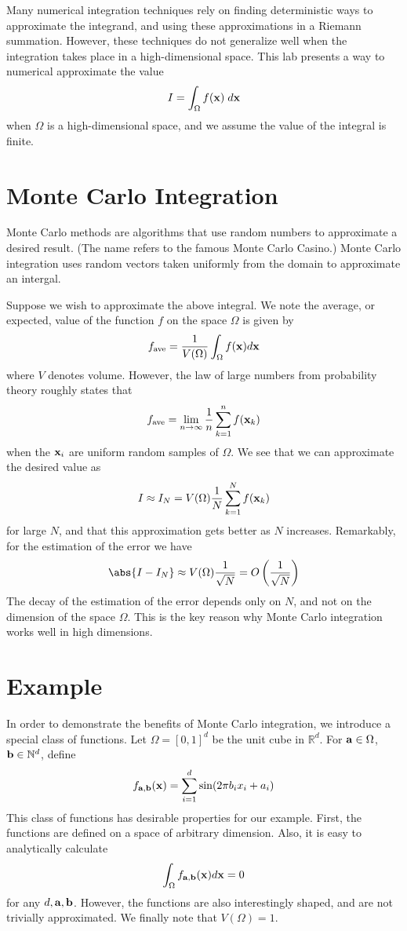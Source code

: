 \newcommand{\fab}{f_{{\bf a},{\bf b}}}


Many numerical integration techniques rely on finding deterministic ways to
approximate the integrand, and using these approximations in a Riemann
summation. However, these techniques do not generalize well when the integration
takes place in a high-dimensional space. This lab presents a way to numerical
approximate the value
\[I = \int_{\Omega} f({\bf x}) \;d{\bf x} \]
when $\Omega$ is a high-dimensional space, and we assume the value of the
integral is finite.

\section*{Monte Carlo Integration}
Monte Carlo methods are algorithms that use random numbers to approximate a
desired result. (The name refers to the famous Monte Carlo Casino.) Monte Carlo
integration uses random vectors taken uniformly from the domain to approximate
an intergal.

Suppose we wish to approximate the above integral. We note the average, or
expected, value of the function $f$ on the space $\Omega$ is given by
\[f_{\text{ave}} = \frac{1}{V(\Omega)}\int_{\Omega} f({\bf x}) d{\bf x} \]
where $V$ denotes volume. However, the law of large numbers from probability
theory roughly states that
\[f_{\text{ave}} = \lim_{n \to \infty} \frac{1}{n} \sum_{k=1}^{n} f({\bf x}_k) \]
when the ${\bf x}_i$ are uniform random samples of $\Omega$. We see that we can
approximate the desired value as
\[I \approx I_N = V(\Omega)\frac{1}{N}\sum_{k=1}^{N} f({\bf x}_k) \]
for large $N$, and that this approximation gets better as $N$ increases.
Remarkably, for the estimation of the error we have
\[\abs{I - I_N} \approx V(\Omega)\frac{1}{\sqrt{N}} =
O\left(\frac{1}{\sqrt{N}}\right) \] 
The decay of the estimation of the error depends only on $N$, and not on the
dimension of the space $\Omega$. This is the key reason why Monte Carlo
integration works well in high dimensions.

\section*{Example}

In order to demonstrate the benefits of Monte Carlo integration, we introduce a
special class of functions. Let $\Omega = [0,1]^d$ be the unit cube in
$\mathbb{R}^d$. For ${\bf a} \in \Omega$, ${\bf b} \in \mathbb{N}^d$, define
\[\fab({\bf x}) = \sum_{i=1}^{d} \sin(2\pi b_i x_i + a_i) \]
This class of functions has desirable properties for our example. First, the
functions are defined on a space of arbitrary dimension. Also, it is easy
to analytically calculate
\[\int_{\Omega} \fab({\bf x}) d{\bf x} = 0 \]
for any $d, {\bf a}, {\bf b}$. However, the functions are also interestingly
shaped, and are not trivially approximated. We finally note that $V(\Omega) = 1$.



